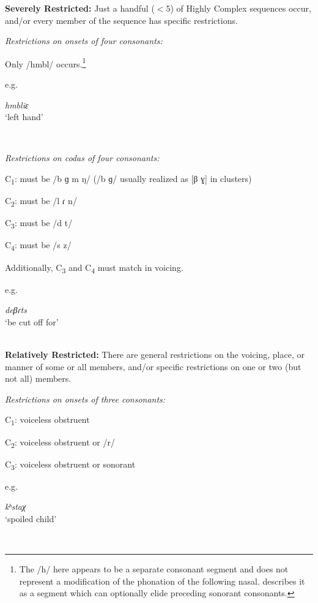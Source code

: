 \ea\label{ex:3.27}
  \textbf{Severely Restricted:} Just a handful ($<5$) of Highly Complex sequences occur, and/or every member of the sequence has specific restrictions.

\ea 
{}

\textit{Restrictions on onsets of four consonants:}

Only /hmbl/ occurs.\footnote{{The /h/ here appears to be a separate consonant segment and does not represent a modification of the phonation of the following nasal. \citet[54]{Marmion2010} describes it as a segment which can optionally elide preceding sonorant consonants.}}

e.g. \parbox[t]{5cm}{\textit{hmbliɛ}\\
    ‘left hand’\\
    \citep[69]{Marmion2010}}\smallskip\\

\ex
{}

\textit{Restrictions on codas of four consonants:}

C\textsubscript{1}: must be /b ɡ m ŋ/ (/b ɡ/ usually realized as [β ɣ] in clusters)

C\textsubscript{2}: must be /l ɾ n/

C\textsubscript{3}: must be /d t/

C\textsubscript{4}: must be /s z/

Additionally, C\textsubscript{3} and C\textsubscript{4} must match in voicing.

e.g. \parbox[t]{7cm}{\textit{deβɾts}\\
    ‘be cut off for’\\
    \citep[41--42]{WieringWiering1994}}\smallskip\\
\z
\z
\ea\label{ex:3.28}
  \textbf{Relatively Restricted:} There are general restrictions on the voicing, place, or manner of some or all members, and/or specific restrictions on one or two (but not all) members.

\ea
{}

\textit{Restrictions on onsets of three consonants:}

C\textsubscript{1}: voiceless obstruent

C\textsubscript{2}: voiceless obstruent or /r/

C\textsubscript{3}: voiceless obstruent or sonorant

e.g. \parbox[t]{7cm}{\textit{kʰstaχ}\\
    ‘spoiled child’\\
    \citep[37]{Haspelmath1993}}\smallskip\\

